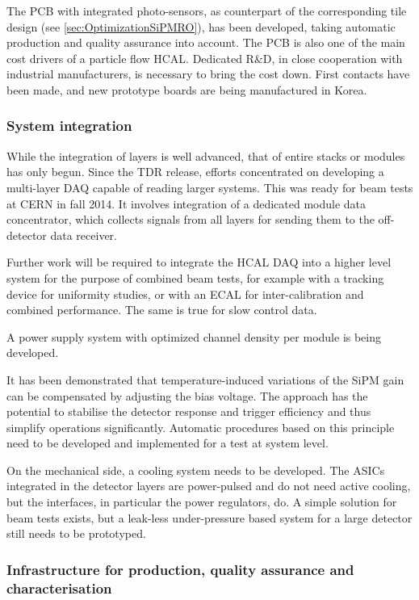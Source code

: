 The PCB with integrated photo-sensors, as counterpart of the corresponding tile design (see \ref{sec:OptimizationSiPMRO}), has been developed, taking automatic production and quality assurance into account. The PCB is also one of the main cost drivers of a particle flow HCAL. Dedicated R\&D, in close cooperation with industrial manufacturers, is necessary to bring the cost down. First contacts have been made, and new prototype boards are being manufactured in Korea.

\subsubsection{System integration}

While the integration of layers is well advanced, that of entire stacks or modules has only begun. Since the TDR release, efforts concentrated on developing a multi-layer DAQ capable of reading larger systems. This was ready for beam tests at CERN  in fall 2014. It involves integration of a dedicated module data concentrator, which collects signals from all layers for sending them to the off-detector data receiver.

Further work will be required to integrate the HCAL DAQ into a higher level system for the purpose of combined beam tests, for example with a tracking device for uniformity studies, or with an ECAL for inter-calibration and combined performance. The same is true for slow control data.

A power supply system with optimized channel density per module is being developed.

It has been demonstrated that temperature-induced variations of the SiPM gain can be compensated by adjusting the bias voltage. The approach has the potential to stabilise the detector response and trigger efficiency and thus simplify operations significantly. Automatic procedures based on this principle need to be developed and implemented for a test at system level.

On the mechanical side, a cooling system needs to be developed. The ASICs integrated in the detector layers are power-pulsed and do not need active cooling, but the interfaces, in particular the power regulators, do. A simple solution for beam tests exists, but a leak-less under-pressure based system for a large detector still needs to be prototyped.

\subsubsection{Infrastructure for production, quality assurance and characterisation}

